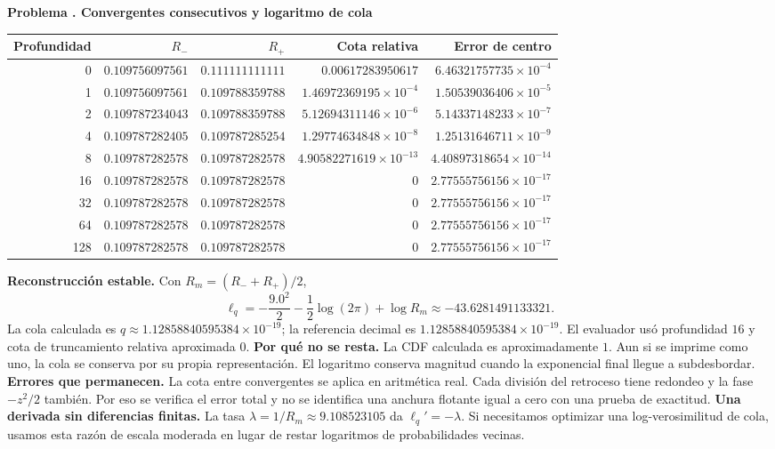 \documentclass[11pt,a4paper]{article}
\theoremstyle{definition}
\newcounter{problema}
\newenvironment{resuelto}[1]{\refstepcounter{problema}\par\medskip\Needspace{6\baselineskip}\textbf{Problema \theproblema. #1}\par}{\par\medskip}
\begin{document}
\begin{resuelto}{Convergentes consecutivos y logaritmo de cola}
\begin{center}\small\begin{tabular}{rrrrr}
\toprule
Profundidad&$R_-$&$R_+$&Cota relativa&Error de centro\\
\midrule
0&$0.109756097561$&$0.111111111111$&$0.00617283950617$&$6.46321757735\times10^{-4}$\\
1&$0.109756097561$&$0.109788359788$&$1.46972369195\times10^{-4}$&$1.50539036406\times10^{-5}$\\
2&$0.109787234043$&$0.109788359788$&$5.12694311146\times10^{-6}$&$5.14337148233\times10^{-7}$\\
4&$0.109787282405$&$0.109787285254$&$1.29774634848\times10^{-8}$&$1.25131646711\times10^{-9}$\\
8&$0.109787282578$&$0.109787282578$&$4.90582271619\times10^{-13}$&$4.40897318654\times10^{-14}$\\
16&$0.109787282578$&$0.109787282578$&$0$&$2.77555756156\times10^{-17}$\\
32&$0.109787282578$&$0.109787282578$&$0$&$2.77555756156\times10^{-17}$\\
64&$0.109787282578$&$0.109787282578$&$0$&$2.77555756156\times10^{-17}$\\
128&$0.109787282578$&$0.109787282578$&$0$&$2.77555756156\times10^{-17}$\\
\bottomrule\end{tabular}\end{center}
\textbf{Reconstrucción estable.} Con $R_m=(R_-+R_+)/2$,
\[
\ell_q=-\frac{9.0^2}{2}-\frac12\log(2\pi)+\log R_m\approx-43.6281491133321.
\]
La cola calculada es $q\approx1.12858840595384\times10^{-19}$; la referencia decimal es $1.12858840595384\times10^{-19}$. El evaluador usó profundidad $16$ y cota de truncamiento relativa aproximada $0$.
\textbf{Por qué no se resta.} La CDF calculada es aproximadamente $1$. Aun si se imprime como uno, la cola se conserva por su propia representación. El logaritmo conserva magnitud cuando la exponencial final llegue a subdesbordar.
\textbf{Errores que permanecen.} La cota entre convergentes se aplica en aritmética real. Cada división del retroceso tiene redondeo y la fase $-z^2/2$ también. Por eso se verifica el error total y no se identifica una anchura flotante igual a cero con una prueba de exactitud.
\textbf{Una derivada sin diferencias finitas.} La tasa $\lambda=1/R_m\approx9.108523105$ da $\ell_q\prime=-\lambda$. Si necesitamos optimizar una log-verosimilitud de cola, usamos esta razón de escala moderada en lugar de restar logaritmos de probabilidades vecinas.
\end{resuelto}
\end{document}
